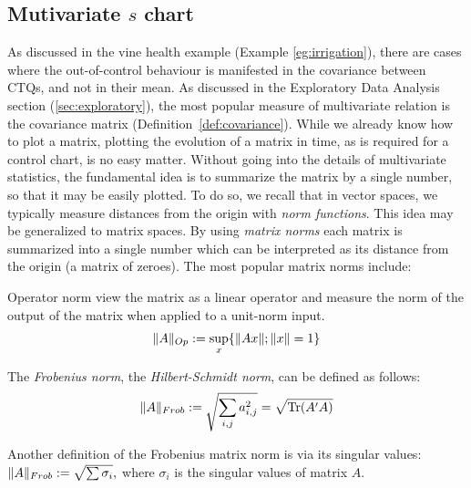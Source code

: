 \subsection{Mutivariate $s$ chart}
\label{sec:multivarite_s}

As discussed in the vine health example (Example \ref{eg:irrigation}), there are cases where the out-of-control behaviour is manifested in the covariance between CTQs, and not in their mean.
As discussed in the Exploratory Data Analysis section (\ref{sec:exploratory}), the most popular measure of multivariate relation is the covariance matrix (Definition~\ref{def:covariance}).
While we already know how to plot a matrix, plotting the evolution of a matrix in time, as is required for a control chart, is no easy matter. 
Without going into the details of multivariate statistics, the fundamental idea is to summarize the matrix by a single number, so that it may be easily plotted.
To do so, we recall that in vector spaces, we typically measure distances from the origin with \emph{norm functions}.
This idea may be generalized to matrix spaces. By using \emph{matrix norms} each matrix is summarized into a single number which can be interpreted as its distance from the origin (a matrix of zeroes).
The most popular matrix norms include:

\begin{definition}
Operator norm view the matrix as a linear operator and measure the norm of the output of the matrix when applied to a unit-norm input.
\begin{align}
	\Vert A \Vert_{Op}:= \sup_x \{ \Vert Ax \Vert; \Vert x \Vert=1 \}
\end{align}
\end{definition}


\begin{definition}
The \emph{Frobenius norm}, \aka the \emph{Hilbert-Schmidt norm}, can be defined as follows:
\begin{align}
	\Vert A \Vert_{Frob}:= \sqrt{\sum_{i,j} a_{i,j}^2} = \sqrt{\operatorname{Tr}(A'A)}
\end{align}
\end{definition}

\begin{extra}
Another definition of the Frobenius matrix norm is via its singular values:
$ 	\Vert A \Vert_{Frob}:= \sqrt{\sum \sigma_i}, $
where $\sigma_i$ is the singular values of matrix $A$.
\end{extra}


